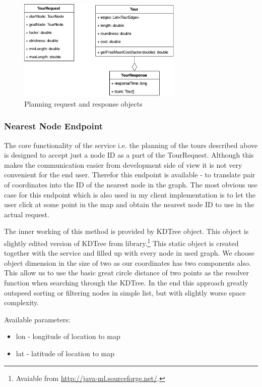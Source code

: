 \documentclass{ctuthesis}
\begin{document}
   


\begin{figure}
	\includegraphics[width=0.7\textwidth]{api.png}
	\caption{Planning request and response objects}
	\label{fig:apiParam}
\end{figure}

\subsubsection{Nearest Node Endpoint
   \\ {}
   }
The core functionality of the service i.e. the planning of the tours described above is designed to accept just a node ID as a part of the TourRequest. Although this makes the communication easier from development side of view it is not very convenient for the end user. Therefor this endpoint is available - to translate pair of coordinates into the ID of the nearest node in the graph. The most obvious use case for this endpoint which is also used in my client implementation is to let the user click at some point in the map and obtain the nearest node ID to use in the actual request. \par
The inner working of this method is provided by KDTree object. This object is slightly edited version of KDTree from  library.\footnote{Avaiable from \url{http://java-ml.sourceforge.net/}.} This static object is created together with the service and filled up with every node in used graph. We choose object dimension in the size of two as our coordinates has two components also. This allow us to use the basic great circle distance of two points as the resolver function when searching through the KDTree. In the end this approach greatly outspeed sorting or filtering nodes in simple list, but with slightly worse space complexity.

\begin{minipage}[t]{1\textwidth}
Available parameters:
\begin{itemize}
  \item lon - longitude of location to map
  \item lat - latitude of location to map
\end{itemize}
\end{minipage}
\end{document}
